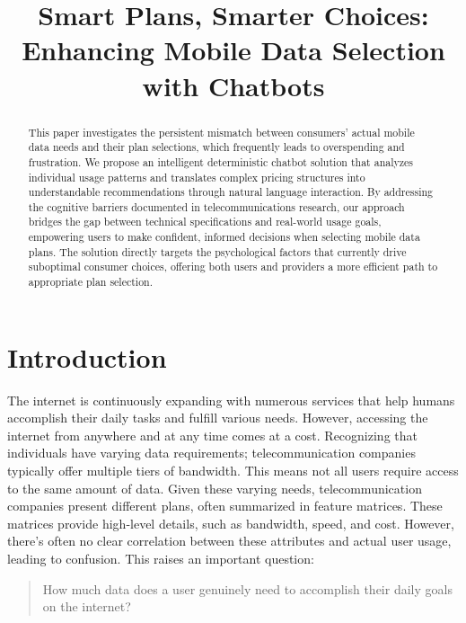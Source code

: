 \documentclass[conference]{IEEEtran}
\begin{document}
\title{Smart Plans, Smarter Choices: Enhancing Mobile Data Selection with Chatbots}

\author{
\and
{}
}

\maketitle

\begin{abstract}
This paper investigates the persistent mismatch between consumers' actual mobile data needs and their plan selections, which frequently leads to overspending and frustration. We propose an intelligent deterministic chatbot solution that analyzes individual usage patterns and translates complex pricing structures into understandable recommendations through natural language interaction. By addressing the cognitive barriers documented in telecommunications research, our approach bridges the gap between technical specifications and real-world usage goals, empowering users to make confident, informed decisions when selecting mobile data plans. The solution directly targets the psychological factors that currently drive suboptimal consumer choices, offering both users and providers a more efficient path to appropriate plan selection.
\end{abstract}

\section{Introduction}
The internet is continuously expanding with numerous services that help humans accomplish their daily tasks and fulfill various needs. However, accessing the internet from anywhere and at any time comes at a cost. Recognizing that individuals have varying data requirements; telecommunication companies typically offer multiple tiers of bandwidth. This means not all users require access to the same amount of data.
Given these varying needs, telecommunication companies present different plans, often summarized in feature matrices. These matrices provide high-level details, such as bandwidth, speed, and cost. However, there's often no clear correlation between these attributes and actual user usage, leading to confusion. This raises an important question:
\begin{quote}
How much data does a user genuinely need to accomplish their daily goals on the internet?
\end{quote}
\end{document}
